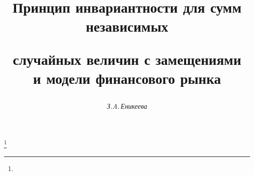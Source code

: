 




%


\newcommand{\E}{\bold E}


\newcommand{\N}{\bold N}








\newcommand{\IND}{\Bbb I}





\newcommand{\tts}[1]{}







\setcounter{page}{74}















\author{\it З.A.\,Еникеева}




\title{Принцип инвариантности для сумм \\ независимых 


случайных величин с замещениями\\ и модели финансового рынка}


\thanks{}





\date{}




